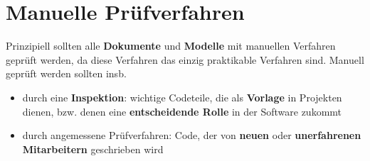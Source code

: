 \section{Manuelle Prüfverfahren}

\vspace{2mm}
\begin{tcolorbox}[title=Manuelle Prüfverfahren]
    Prinzipiell sollten alle \textbf{Dokumente} und \textbf{Modelle} mit manuellen Verfahren geprüft werden, da diese Verfahren das einzig praktikable Verfahren sind.
    Manuell geprüft werden sollten insb.

    \begin{itemize}
        \item durch eine \textbf{Inspektion}: wichtige Codeteile, die als \textbf{Vorlage} in Projekten dienen, bzw. denen eine \textbf{entscheidende Rolle} in der Software zukommt
        \item durch angemessene Prüfverfahren: Code, der von \textbf{neuen} oder \textbf{unerfahrenen Mitarbeitern} geschrieben wird
    \end{itemize}


\end{tcolorbox}
